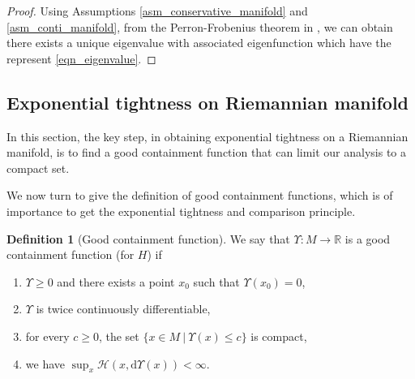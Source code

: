 \documentclass[a4paper]{article}
\numberwithin{equation}{section}
\theoremstyle{definition}
\newtheorem{definition}[theorem]{Definition}
\begin{document}
\begin{proof}
Using Assumptions \ref{asm_conservative_manifold} and \ref{asm_conti_manifold}, from the Perron-Frobenius theorem in \cite{DV1975}, we can obtain there exists a unique eigenvalue with associated eigenfunction which have the represent \eqref{eqn_eigenvalue}. 
\end{proof}

\subsection{Exponential tightness on Riemannian manifold}
In this section, the key step, in obtaining exponential tightness on a Riemannian manifold, is to find a good containment function that can limit our analysis to a compact set.
\par
We now turn to give the definition of good containment functions, which is of importance to get the exponential tightness and comparison principle.
\begin{definition}[Good containment function]
	We say that $\Upsilon:M\to \mathbb{R}$ is a good containment function (for $H$) if 
	\begin{enumerate}[$(\Upsilon a)$]
		\item $\Upsilon\geq 0$ and there exists a point $x_0$ such that $\Upsilon(x_0)=0$,
		\item $\Upsilon$ is twice continuously differentiable,
		\item for every $c\geq 0$, the set $\{x\in M ~|~ \Upsilon(x)\leq c\}$ is compact,
		\item we have $\sup_x\mathcal{H}(x,\mathrm{d}\Upsilon(x))<\infty$.
	\end{enumerate}
\end{definition}
\end{document}
